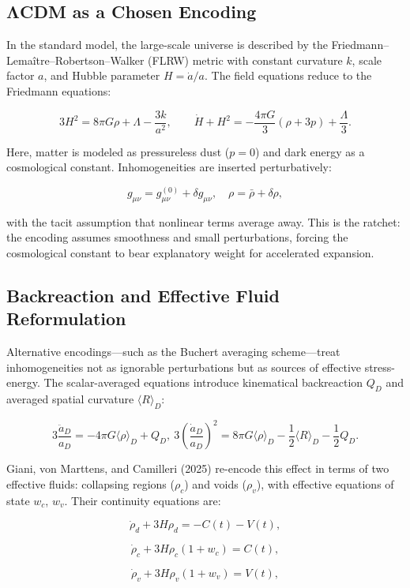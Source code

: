 \documentclass[12pt]{book}
\begin{document}
\subsection{ΛCDM as a Chosen Encoding}
In the standard model, the large-scale universe is described by the Friedmann–Lemaître–Robertson–Walker (FLRW) metric with constant curvature \( k \), scale factor \( a \), and Hubble parameter \( H = \dot{a}/a \). The field equations reduce to the Friedmann equations:

\[ 3H^2 = 8\pi G \rho + \Lambda - \frac{3k}{a^2}, \qquad \dot{H} + H^2 = -\frac{4\pi G}{3}(\rho + 3p) + \frac{\Lambda}{3}. \]

Here, matter is modeled as pressureless dust (\( p=0 \)) and dark energy as a cosmological constant. Inhomogeneities are inserted perturbatively:

\[ g_{\mu\nu} = g^{(0)}_{\mu\nu} + \delta g_{\mu\nu}, \quad \rho = \bar{\rho} + \delta \rho, \]

with the tacit assumption that nonlinear terms average away. This is the ratchet: the encoding assumes smoothness and small perturbations, forcing the cosmological constant to bear explanatory weight for accelerated expansion.

\subsection{Backreaction and Effective Fluid Reformulation}
Alternative encodings—such as the Buchert averaging scheme—treat inhomogeneities not as ignorable perturbations but as sources of effective stress-energy. The scalar-averaged equations introduce kinematical backreaction \( Q_D \) and averaged spatial curvature \( \langle R \rangle_D \):

\[ 3 \frac{\ddot{a}_D}{a_D} = -4\pi G \langle \rho \rangle_D + Q_D, \ 3 \left( \frac{\dot{a}_D}{a_D} \right)^2 = 8\pi G \langle \rho \rangle_D - \frac{1}{2}\langle R \rangle_D - \frac{1}{2}Q_D. \]

Giani, von Marttens, and Camilleri (2025) re-encode this effect in terms of two effective fluids: collapsing regions (\( \rho_c \)) and voids (\( \rho_v \)), with effective equations of state \( w_c \), \( w_v \). Their continuity equations are:

\[ \dot{\rho}_d + 3H\rho_d = -C(t) - V(t), \tag{6.1} \]

\[ \dot{\rho}_c + 3H\rho_c (1 + w_c) = C(t), \tag{6.2} \]

\[ \dot{\rho}_v + 3H\rho_v (1 + w_v) = V(t), \tag{6.3} \]
\end{document}
